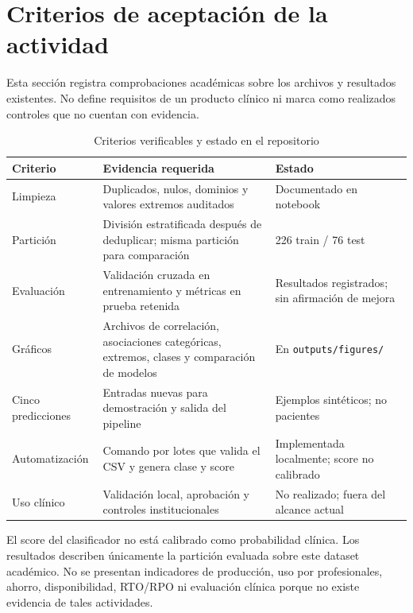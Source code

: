 \section{Criterios de aceptación de la actividad}
\label{sec:requisitos-aceptacion}

Esta sección registra comprobaciones académicas sobre los archivos y resultados existentes. No define requisitos de un producto clínico ni marca como realizados controles que no cuentan con evidencia.

\begin{table}[H]
  \centering
  \caption{Criterios verificables y estado en el repositorio}
  \label{tab:aceptacion-actual}
  \small
  \begin{tabularx}{\textwidth}{@{}p{3cm}X p{3cm}@{}}
    \toprule
    Criterio & Evidencia requerida & Estado \\
    \midrule
    Limpieza & Duplicados, nulos, dominios y valores extremos auditados & Documentado en notebook \\
    Partición & División estratificada después de deduplicar; misma partición para comparación & 226 train / 76 test \\
    Evaluación & Validación cruzada en entrenamiento y métricas en prueba retenida & Resultados registrados; sin afirmación de mejora \\
    Gráficos & Archivos de correlación, asociaciones categóricas, extremos, clases y comparación de modelos & En \texttt{outputs/figures/} \\
    Cinco predicciones & Entradas nuevas para demostración y salida del pipeline & Ejemplos sintéticos; no pacientes \\
    Automatización & Comando por lotes que valida el CSV y genera clase y score & Implementada localmente; score no calibrado \\
    Uso clínico & Validación local, aprobación y controles institucionales & No realizado; fuera del alcance actual \\
    \bottomrule
  \end{tabularx}
\end{table}

El score del clasificador no está calibrado como probabilidad clínica. Los resultados describen únicamente la partición evaluada sobre este dataset académico. No se presentan indicadores de producción, uso por profesionales, ahorro, disponibilidad, RTO/RPO ni evaluación clínica porque no existe evidencia de tales actividades.
